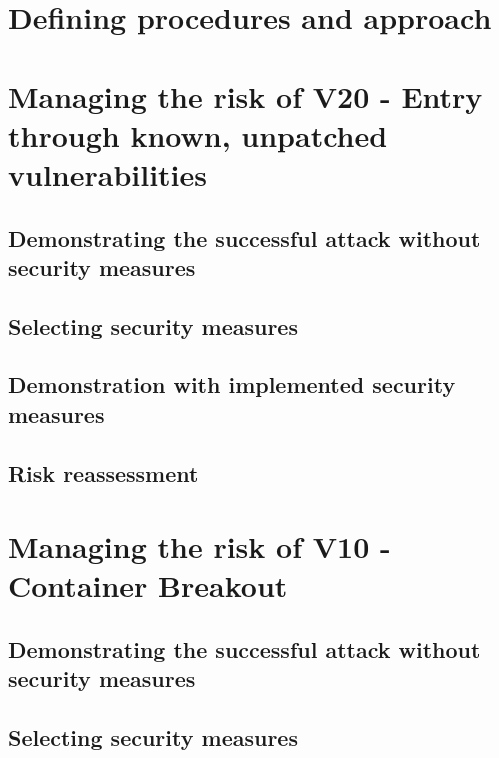 \section{Defining procedures and approach}

\section{Managing the risk of V20 - Entry through known, unpatched vulnerabilities}

\subsection{Demonstrating the successful attack without security measures}

\subsection{Selecting security measures}

\subsection{Demonstration with implemented security measures}

\subsection{Risk reassessment}

\section{Managing the risk of V10 - Container Breakout}

\subsection{Demonstrating the successful attack without security measures}


\subsection{Selecting security measures}

